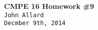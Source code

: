 \documentclass[a4paper,10pt]{article}
\begin{document}
   \begin{center}
      \Large\textbf{CMPE 16 Homework \#9}\\
      \large\texttt{John Allard} \\
      \small\texttt{Decmber 9th, 2014}
   \end{center}

\end{document}
